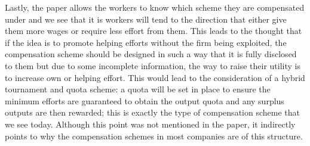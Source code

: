 \documentclass[a4paper,10pt]{article}
\theoremstyle{definition}
\begin{document}
Lastly, the paper allows the workers to know which scheme they are compensated under and we see that it is workers will tend to the direction that either give them more wages or require less effort from them. This leads to the thought that if the idea is to promote helping efforts without the firm being exploited, the compensation scheme should be designed in such a way that it is fully disclosed to them but due to some incomplete information, the way to raise their utility is to increase own or helping effort. This would lead to the consideration of a hybrid tournament and quota scheme:  a quota will be set in place to ensure the minimum efforts are guaranteed to obtain the output quota and any surplus outputs are then rewarded; this is exactly the type of compensation scheme that we see today. Although this point was not mentioned in the paper, it indirectly points to why the compensation schemes in most companies are of this structure. 


%
%
%
\end{document}
